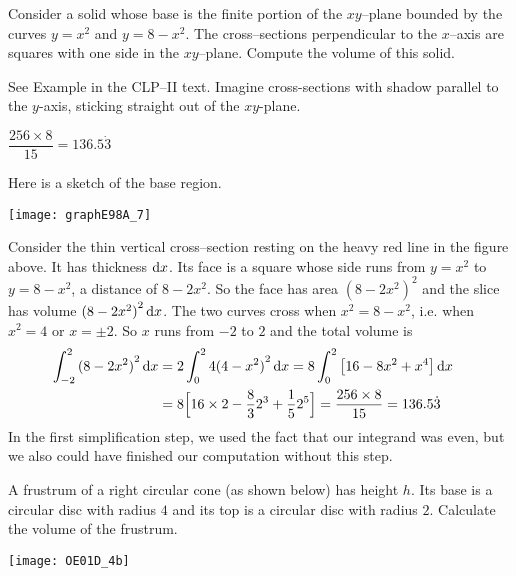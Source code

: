 \begin{question}[1998A] %
Consider a solid whose base is the finite portion of the
$xy$--plane bounded by the curves $y=x^2$ and $y=8-x^2$. The cross--sections
perpendicular to the $x$--axis are squares with one side in the $xy$--plane.
Compute the volume of this solid.
\end{question}

\begin{hint}
See Example  in the
CLP--II text. Imagine cross-sections with shadow parallel to the $y$-axis, sticking straight out of the $xy$-plane.
\end{hint}

\begin{answer}
 $\dfrac{256\times 8}{15}=136.5\dot3$
\end{answer}

\begin{solution}
Here is a sketch of the base region.

\begin{center}
       \texttt{[image: graphE98A\_7]}
\end{center}

\noindent
Consider the thin vertical cross--section resting on the heavy red
line in the figure above. It has thickness $\mathrm{d}x$. Its face is a square
whose side runs from $y=x^2$ to $y=8-x^2$, a distance of $8-2x^2$. So the
face has area ${(8-2x^2)}^2$ and the slice has volume ${(8-2x^2)}^2\,\mathrm{d}x$. The two
curves cross when $x^2=8-x^2$, i.e. when $x^2=4$ or $x=\pm 2$. So $x$ runs
from $-2$ to $2$ and the total volume is
\begin{align*}
\int_{-2}^{2}{(8-2x^2)}^2\,\mathrm{d}x&=2\int_0^2 4{(4-x^2)}^2\,\mathrm{d}x
=8\int_0^2\big[16-8x^2+x^4\big]\,\mathrm{d}x\cr
&=8\Big[16\times 2-\frac{8}{3}2^3+\frac{1}{5}2^5\Big]
=\frac{256\times 8}{15}=136.5\dot3
\end{align*}
In the first simplification step, we used the fact that our integrand was even, but we also could have finished our computation without this step.
\end{solution}

\begin{Mquestion}[2001D] %
A frustrum of a right circular cone (as shown below) has
height $h$. Its base is a circular disc with radius $4$ and its top is
a circular disc with radius $2$. Calculate the volume of the frustrum.
\begin{center}
       \texttt{[image: OE01D\_4b]}
\end{center}
\end{Mquestion}

